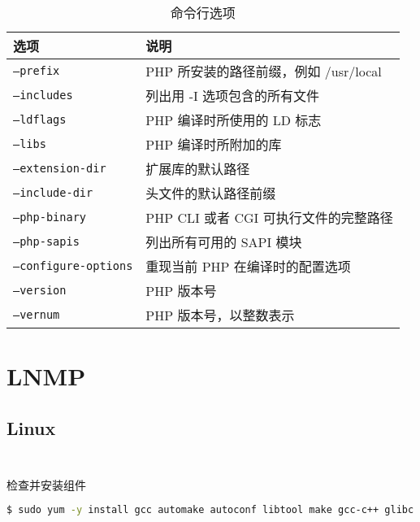 \begin{table}[htbp]
\centering
\caption{命令行选项}
\begin{tabular}{|l|l|}
\hline
选项					&说明\\
\hline
\texttt{--prefix}			&PHP 所安装的路径前缀，例如 /usr/local\\
\hline
\texttt{--includes}		&列出用 -I 选项包含的所有文件\\
\hline
\texttt{--ldflags}			&PHP 编译时所使用的 LD 标志\\
\hline
\texttt{--libs}			&PHP 编译时所附加的库\\
\hline
\texttt{--extension-dir}	&扩展库的默认路径\\
\hline
\texttt{--include-dir}		&头文件的默认路径前缀\\
\hline
\texttt{--php-binary}		&PHP CLI 或者 CGI 可执行文件的完整路径\\
\hline
\texttt{--php-sapis}		&列出所有可用的 SAPI 模块\\
\hline
\texttt{--configure-options}	&重现当前 PHP 在编译时的配置选项\\
\hline
\texttt{--version}			&PHP 版本号\\
\hline
\texttt{--vernum}		&PHP 版本号，以整数表示\\
\hline
\end{tabular}
\end{table}




\chapter{LNMP}



\section{Linux}


\begin{lstlisting}[language=bash]

\end{lstlisting}




\begin{lstlisting}[language=bash]

\end{lstlisting}





检查并安装组件


\begin{lstlisting}[language=bash]
$ sudo yum -y install gcc automake autoconf libtool make gcc-c++ glibc
\end{lstlisting}

